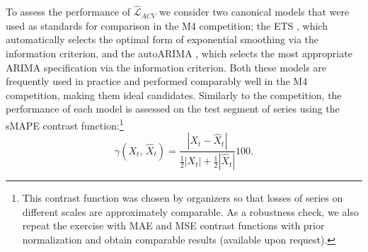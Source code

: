 \documentclass[11pt,dvipsnames]{article}
\begin{document}
To assess the performance of $ \widehat{\mathcal{L}}_{ACV} $ we consider two canonical models that were used as standards for comparison in the M4 competition; the ETS \citep{hyndmanStateSpaceFramework2002}, which automatically selects the optimal form of exponential smoothing via the information criterion, and the autoARIMA \citep{hyndmanAutomaticTimeSeries2008}, which selects the most appropriate ARIMA specification via the information criterion. Both these models are frequently used in practice and performed comparably well in the M4 competition, making them ideal candidates. Similarly to the competition, the performance of each model is assessed on the test segment of series using the sMAPE contrast function:\footnote{This contrast function was chosen by organizers so that losses of series on different scales are approximately comparable. As a robustness check, we also repeat the exercise with MAE and MSE contrast functions with prior normalization and obtain comparable results (available upon request).}
\begin{equation} \label{eq:M4contrast} 
 \gamma\left(X_{t},\, \widehat{X}_{t}\right)=\dfrac{|X_{t}-\widehat{X}_{t}|}{ \frac{1}{2}|X_{t}| + \frac{1}{2}|\widehat{X}_{t}|} 100.
\end{equation}
\end{document}
